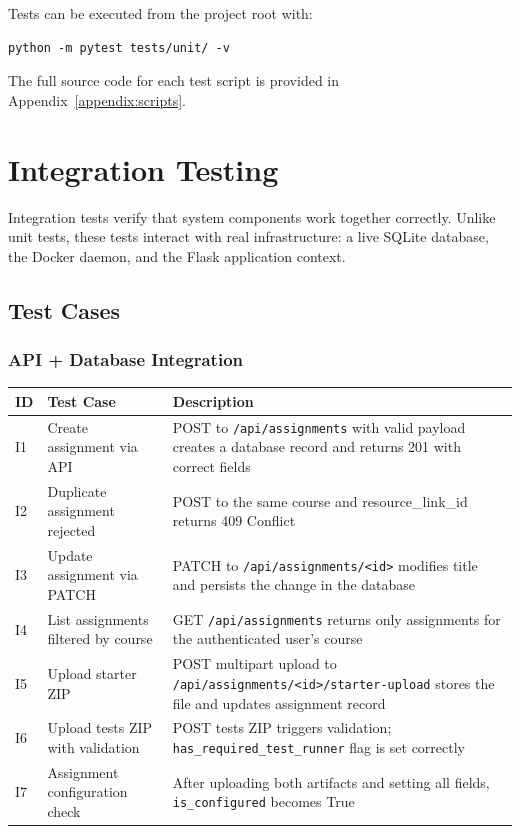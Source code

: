 \documentclass[12pt, letterpaper]{article}
\begin{document}
Tests can be executed from the project root with:

\begin{lstlisting}[style=bashstyle]
python -m pytest tests/unit/ -v
\end{lstlisting}

\noindent The full source code for each test script is provided in Appendix~\ref{appendix:scripts}.

\section{Integration Testing}

Integration tests verify that system components work together correctly. Unlike unit tests, these tests interact with real infrastructure: a live SQLite database, the Docker daemon, and the Flask application context.

\subsection{Test Cases}

\subsubsection{API + Database Integration}

\begin{longtable}{p{0.5cm} p{4.5cm} p{8.5cm}}
    \toprule
    \textbf{ID} & \textbf{Test Case} & \textbf{Description} \\
    \midrule
    I1 & Create assignment via API & POST to \texttt{/api/assignments} with valid payload creates a database record and returns 201 with correct fields \\
    I2 & Duplicate assignment rejected & POST to the same course and resource\_link\_id returns 409 Conflict \\
    I3 & Update assignment via PATCH & PATCH to \texttt{/api/assignments/<id>} modifies title and persists the change in the database \\
    I4 & List assignments filtered by course & GET \texttt{/api/assignments} returns only assignments for the authenticated user's course \\
    I5 & Upload starter ZIP & POST multipart upload to \texttt{/api/assignments/<id>/starter-upload} stores the file and updates assignment record \\
    I6 & Upload tests ZIP with validation & POST tests ZIP triggers validation; \texttt{has\_required\_test\_runner} flag is set correctly \\
    I7 & Assignment configuration check & After uploading both artifacts and setting all fields, \texttt{is\_configured} becomes True \\
    \bottomrule
\end{longtable}
\end{document}
